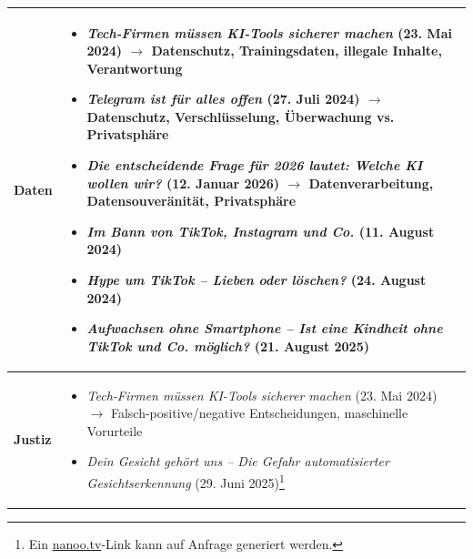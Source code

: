 \begin{longtable}{@{}lp{14cm}@{}}
	\textbf{Daten} & 
	\begin{itemize}[leftmargin=*,noitemsep,topsep=0pt]
		\item[\faFilePdf{}] \textit{Tech-Firmen müssen KI-Tools sicherer machen} (23. Mai 2024) \newline
		$\rightarrow$ Datenschutz, Trainingsdaten, illegale Inhalte, Verantwortung
		\item[\faFilePdf{}] \textit{Telegram ist für alles offen} (27. Juli 2024) \newline
		$\rightarrow$ Datenschutz, Verschlüsselung, Überwachung vs. Privatsphäre
		\item[\faFilePdf{}] \textit{Die entscheidende Frage für 2026 lautet: Welche KI wollen wir?} (12. Januar 2026) \newline
		$\rightarrow$ Datenverarbeitung, Datensouveränität, Privatsphäre
		\item[\faPlayCircle{}] \textit{Im Bann von TikTok, Instagram und Co.} (11. August 2024) \href{https://www.srf.ch/play/tv/kassensturz/video/im-bann-von-tiktok-instagram-und-co-?urn=urn:srf:video:3cdc375c-5f1d-4029-bda4-9690c27c9c0e}{\faLink}
		\item[\faPlayCircle{}] \textit{Hype um TikTok -- Lieben oder löschen?} (24. August 2024) \href{https://www.srf.ch/play/tv/dok/video/hype-um-tiktok---lieben-oder-loeschen?urn=urn:srf:video:6b2838d3-7f05-4dc3-897d-dfc68b7430c7}{\faLink}
		\item[\faPlayCircle{}] \textit{Aufwachsen ohne Smartphone -- Ist eine Kindheit ohne TikTok und Co. möglich?} (21. August 2025) \href{https://www.srf.ch/play/tv/nzz-format/video/aufwachsen-ohne-smartphone---ist-eine-kindheit-ohne-tiktok-und-co--moeglich?urn=urn:srf:video:0fb13fb2-cc18-448f-9a5f-2ff411c16877}{\faLink}
	\end{itemize} \\
	\midrule
	
	\textbf{Justiz} & 
	\begin{itemize}[leftmargin=*,noitemsep,topsep=0pt]
		\item[\faFilePdf{}] \textit{Tech-Firmen müssen KI-Tools sicherer machen} (23. Mai 2024) \newline
				$\rightarrow$ Falsch-positive/negative Entscheidungen, maschinelle Vorurteile
				\item[\faPlayCircle{}] \textit{Dein Gesicht gehört uns -- Die Gefahr automatisierter Gesichtserkennung} (29. Juni 2025)\footnote{Ein \url{nanoo.tv}-Link kann auf Anfrage generiert werden.}
	\end{itemize} \\
	\midrule
	

\end{longtable}
